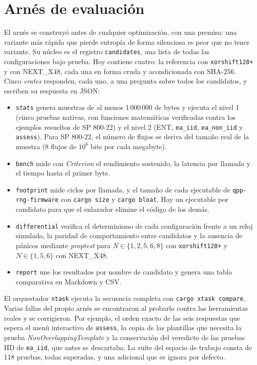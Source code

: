 \section{Arnés de evaluación}
\label{sec:arnes}

El arnés se construyó antes de cualquier optimización, con una premisa: una variante más rápida que pierde entropía de forma silenciosa es peor que no tener variante. Su núcleo es el registro \texttt{candidates}, una lista de todas las configuraciones bajo prueba. Hoy contiene cuatro: la referencia con \texttt{xorshift128+} y con NEXT\_X48, cada una en forma cruda y acondicionada con SHA-256. Cinco \textit{crates} responden, cada uno, a una pregunta sobre todos los candidatos, y escriben su respuesta en JSON:

\begin{itemize}
    \item \texttt{stats} genera muestras de al menos 1\,000\,000 de bytes y ejecuta el nivel 1 (cinco pruebas nativas, con funciones matemáticas verificadas contra los ejemplos resueltos de SP 800-22) y el nivel 2 (ENT, \texttt{ea\_iid}, \texttt{ea\_non\_iid} y \texttt{assess}). Para SP 800-22, el número de flujos se deriva del tamaño real de la muestra (8 flujos de $10^6$ bits por cada megabyte).
    \item \texttt{bench} mide con \textit{Criterion} el rendimiento sostenido, la latencia por llamada y el tiempo hasta el primer byte.
    \item \texttt{footprint} mide ciclos por llamada, y el tamaño de cada ejecutable de \texttt{qpp-rng-firmware} con \texttt{cargo size} y \texttt{cargo bloat}. Hay un ejecutable por candidato para que el enlazador elimine el código de los demás.
    \item \texttt{differential} verifica el determinismo de cada configuración frente a un reloj simulado, la paridad de comportamiento entre candidatos y la ausencia de pánicos mediante \textit{proptest} para $N \in \{1, 2, 5, 6, 8\}$ con \texttt{xorshift128+} y $N \in \{1, 5, 6\}$ con NEXT\_X48.
    \item \texttt{report} une los resultados por nombre de candidato y genera una tabla comparativa en Markdown y CSV.
\end{itemize}

El orquestador \texttt{xtask} ejecuta la secuencia completa con \texttt{cargo xtask compare}. Varias fallas del propio arnés se encontraron al probarlo contra las herramientas reales y se corrigieron. Por ejemplo, el orden exacto de las seis respuestas que espera el menú interactivo de \texttt{assess}, la copia de las plantillas que necesita la prueba \textit{NonOverlappingTemplate} y la conservación del veredicto de las pruebas IID de \texttt{ea\_iid}, que antes se descartaba. La suite del espacio de trabajo consta de 118 pruebas, todas superadas, y una adicional que se ignora por defecto.

